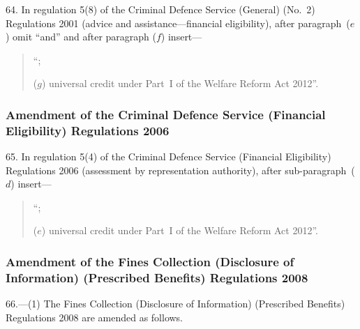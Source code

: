 \documentclass[12pt,a4paper]{article}
\begin{document}
64.  In regulation 5(8) of the Criminal Defence Service (General) (No.~2) Regulations 2001 (advice and assistance—financial eligibility), after paragraph~($e$)  omit “and” and after paragraph ($f$)  insert—
\begin{quotation}
“;

($g$) universal credit under Part~I of the Welfare Reform Act 2012”.
\end{quotation}

\subsubsection[65. Amendment of the Criminal Defence Service (Financial Eligibility) Regulations 2006]{Amendment of the Criminal Defence Service (Financial Eligibility) Regulations 2006}

65.  In regulation 5(4) of the Criminal Defence Service (Financial Eligibility) Regulations 2006 (assessment by representation authority), after sub-paragraph~($d$)  insert—
\begin{quotation}
“;

($e$) universal credit under Part~I of the Welfare Reform Act 2012”.
\end{quotation}

\subsubsection[66. Amendment of the Fines Collection (Disclosure of Information) (Prescribed Benefits) Regulations 2008]{Amendment of the Fines Collection (Disclosure of Information) (Prescribed Benefits) Regulations 2008}

66.—(1) The Fines Collection (Disclosure of Information) (Prescribed Benefits) Regulations 2008 are amended as follows.
\end{document}
